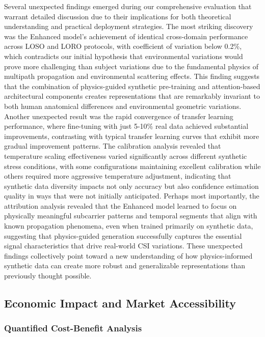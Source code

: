 \documentclass[journal]{IEEEtran}
\begin{document}
Several unexpected findings emerged during our comprehensive evaluation that warrant detailed discussion due to their implications for both theoretical understanding and practical deployment strategies. The most striking discovery was the Enhanced model's achievement of identical cross-domain performance across LOSO and LORO protocols, with coefficient of variation below 0.2\%, which contradicts our initial hypothesis that environmental variations would prove more challenging than subject variations due to the fundamental physics of multipath propagation and environmental scattering effects. This finding suggests that the combination of physics-guided synthetic pre-training and attention-based architectural components creates representations that are remarkably invariant to both human anatomical differences and environmental geometric variations. Another unexpected result was the rapid convergence of transfer learning performance, where fine-tuning with just 5-10\% real data achieved substantial improvements, contrasting with typical transfer learning curves that exhibit more gradual improvement patterns. The calibration analysis revealed that temperature scaling effectiveness varied significantly across different synthetic stress conditions, with some configurations maintaining excellent calibration while others required more aggressive temperature adjustment, indicating that synthetic data diversity impacts not only accuracy but also confidence estimation quality in ways that were not initially anticipated. Perhaps most importantly, the attribution analysis revealed that the Enhanced model learned to focus on physically meaningful subcarrier patterns and temporal segments that align with known propagation phenomena, even when trained primarily on synthetic data, suggesting that physics-guided generation successfully captures the essential signal characteristics that drive real-world CSI variations. These unexpected findings collectively point toward a new understanding of how physics-informed synthetic data can create more robust and generalizable representations than previously thought possible.

\subsection{Economic Impact and Market Accessibility}

\subsubsection{Quantified Cost-Benefit Analysis}
\end{document}
